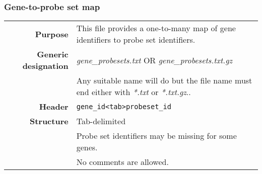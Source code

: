\documentclass[a4paper,12pt]{article}
\begin{document}
\subsubsection{Gene-to-probe set map}
\label{gep:gene}

\begin{tabular}{rp{12cm}}
\textbf{Purpose} & This file provides a one-to-many map of gene identifiers to probe set identifiers. \\
\textbf{Generic designation} & \textit{gene\_probesets.txt} OR \textit{gene\_probesets.txt.gz} \\
  & Any suitable name will do but the file name must end either with \textit{*.txt} or \textit{*.txt.gz}.. \\
\textbf{Header} & \texttt{gene\_id\textless tab\textgreater probeset\_id} \\
\textbf{Structure} & Tab-delimited \\
  & Probe set identifiers may be missing for some genes. \\
  & No comments are allowed. \\
\end{tabular}
\end{document}
